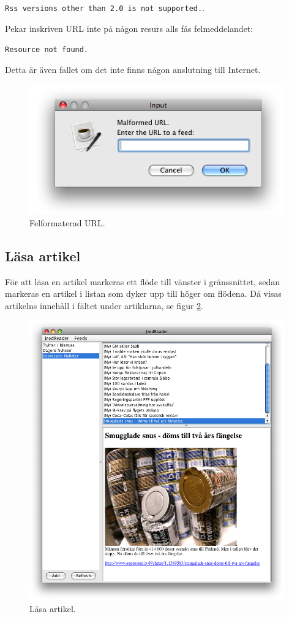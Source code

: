 \documentclass[titlepage, twoside, a4paper, 12pt]{article}
\begin{document}
\verb!Rss versions other than 2.0 is not supported.!.

Pekar inskriven URL inte på någon resurs alls fås felmeddelandet:

\verb!Resource not found.!

Detta är även fallet om det inte finns någon anslutning till
Internet.

\begin{figure}[!hbp]
  \begin{center}
    \includegraphics[width=110mm]{images/malformed-url.png}
    \caption{Felformaterad URL.}
    \label{fig:malformed-url}
  \end{center}
\end{figure}

\subsection{Läsa artikel}
För att läsa en artikel markeras ett flöde till vänster i
gränssnittet, sedan markeras en artikel i listan som dyker upp till
höger om flödena. Då visas artikelns innehåll i fältet under
artiklarna, se figur \ref{fig:read-item-out}.

\begin{figure}[!hbp]
  \begin{center}
    \includegraphics[width=110mm]{images/read-item-out.png}
    \caption{Läsa artikel.}
    \label{fig:read-item-out}
  \end{center}
\end{figure}
\end{document}
